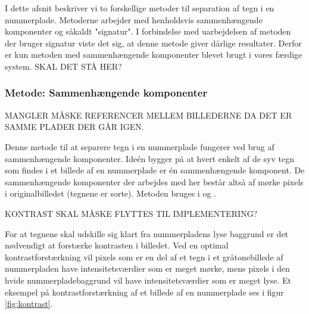 



I dette afsnit beskriver vi to forskellige metoder til separation af tegn i en nummerplade. Metoderne arbejder med henholdsvis sammenhængende komponenter og såkaldt "signatur". I forbindelse med uarbejdelsen af metoden der bruger signatur viste det sig, at denne metode giver dårlige resultater. Derfor er kun metoden med sammenhængende komponenter blevet brugt i vores færdige system. SKAL DET STÅ HER?


\subsubsection*{Metode: Sammenhængende komponenter}

MANGLER MÅSKE REFERENCER MELLEM BILLEDERNE DA DET ER SAMME PLADER DER GÅR IGEN.

Denne metode til at separere tegn i en nummerplade fungerer ved brug af sammenhængende komponenter. Ideén bygger på at hvert enkelt af de syv tegn som findes i et billede af en nummerplade er én sammenhængende komponent. De sammenhængende komponenter der arbejdes med her består altså af mørke pixels i originalbilledet (tegnene er sorte). Metoden bruges i \cite{nijhuis} og \cite{kwas}.

KONTRAST SKAL MÅSKE FLYTTES TIL IMPLEMENTERING?

For at tegnene skal udskille sig klart fra nummerpladens lyse baggrund er det nødvendigt at forstærke kontrasten i billedet. Ved en optimal kontrastforstærkning vil pixels som er en del af et tegn i et gråtonebillede af nummerpladen have intensitetsværdier som er meget mørke, mens pixels i den hvide nummerpladebaggrund vil have intensitetsværdier som er meget lyse. Et eksempel på kontrastforstærkning af et billede af en nummerplade ses i figur \vref{fig:kontrast}.

